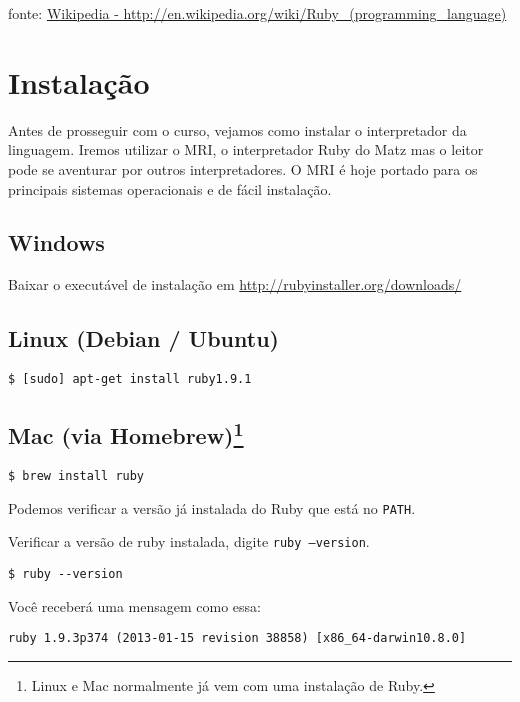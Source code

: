 \documentclass[serif,mathserif]{book}
\newcommand*{\Package}[1]{\texttt{#1}}%
\begin{document}
fonte: \href{http://en.wikipedia.org/wiki/Ruby_(programming_language)}{Wikipedia - http://en.wikipedia.org/wiki/Ruby\_(programming\_language)}
 
\section{Instalação}
Antes de prosseguir com o curso, vejamos como instalar o interpretador da linguagem. Iremos utilizar o MRI, o interpretador
Ruby do Matz mas o leitor pode se aventurar por outros interpretadores. O MRI é hoje portado para os 
principais sistemas operacionais e de fácil instalação.
 
\subsection{Windows}

Baixar o executável de instalação em \url{http://rubyinstaller.org/downloads/}
 
\subsection{Linux (Debian / Ubuntu)}

\begin{lstlisting}[style=BashInputStyle]
$ [sudo] apt-get install ruby1.9.1
\end{lstlisting}

\subsection{Mac (via Homebrew)\footnote{Linux e Mac normalmente já vem com uma instalação de Ruby.}}

\begin{lstlisting}[style=BashInputStyle]
$ brew install ruby
\end{lstlisting}

Podemos verificar a versão já instalada do Ruby que está no \Package{PATH}.

Verificar a versão de ruby instalada, digite  \Package{ruby --version}.

\begin{lstlisting}[style=BashInputStyle]
$ ruby --version
\end{lstlisting}

Você receberá uma mensagem como essa:
\begin{lstlisting}[style=BashOutputStyle]
ruby 1.9.3p374 (2013-01-15 revision 38858) [x86_64-darwin10.8.0]
\end{lstlisting}
\end{document}
